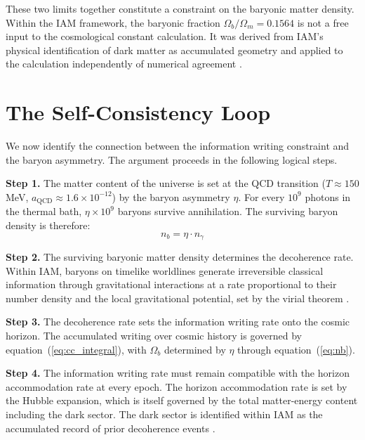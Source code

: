 \documentclass[12pt,a4paper]{article}
\begin{document}
These two limits together constitute a constraint on the baryonic matter
density. Within the IAM framework, the baryonic fraction $\Omega_b /
\Omega_m = 0.1564$ \citep{planck2020} is not a free input to the
cosmological constant calculation. It was derived from IAM's physical
identification of dark matter as accumulated geometry
\citep{mahaffey2026_virial_dm} and applied to the calculation
independently of numerical agreement \citep{mahaffey2026_cc}.

\section{The Self-Consistency Loop}
\label{sec:loop}

We now identify the connection between the information writing constraint
and the baryon asymmetry. The argument proceeds in the following logical
steps.

\textbf{Step 1.} The matter content of the universe is set at the QCD
transition ($T \approx 150$ MeV, $a_\mathrm{QCD} \approx 1.6 \times
10^{-12}$) by the baryon asymmetry $\eta$. For every $10^9$
photons in the thermal bath, $\eta \times 10^9$ baryons survive
annihilation. The surviving baryon density is therefore:
\begin{equation}
n_b = \eta \cdot n_\gamma
\label{eq:nb}
\end{equation}

\textbf{Step 2.} The surviving baryonic matter density determines the
decoherence rate. Within IAM, baryons on timelike worldlines generate
irreversible classical information through gravitational interactions at
a rate proportional to their number density and the local gravitational
potential, set by the virial theorem \citep{mahaffey2026_virial}.

\textbf{Step 3.} The decoherence rate sets the information writing rate
onto the cosmic horizon. The accumulated writing over cosmic history is
governed by equation~(\ref{eq:cc_integral}), with $\Omega_b$ determined
by $\eta$ through equation~(\ref{eq:nb}).

\textbf{Step 4.} The information writing rate must remain compatible
with the horizon accommodation rate at every epoch. The horizon
accommodation rate is set by the Hubble expansion, which is itself
governed by the total matter-energy content including the dark sector.
The dark sector is identified within IAM as the accumulated record of
prior decoherence events \citep{mahaffey2026_virial_dm}.
\end{document}
